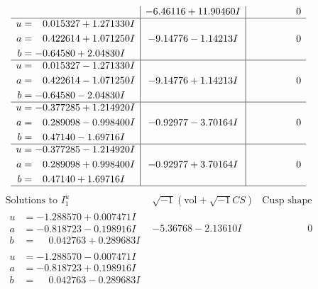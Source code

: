 \documentclass[1p]{elsarticle_modified}
\theoremstyle{definition}
\newcommand{\I}{\sqrt{-1}}
\begin{document}
$$\begin{array}{c|c|c}
 & -6.46116 + 11.90460 I & \phantom{-0.000000 } 0 \\ \hline\begin{aligned}
u &= \phantom{-}0.015327 + 1.271330 I \\
a &= \phantom{-}0.422614 + 1.071250 I \\
b &= -0.64580 + 2.04830 I\end{aligned}
 & -9.14776 - 1.14213 I & \phantom{-0.000000 } 0 \\ \hline\begin{aligned}
u &= \phantom{-}0.015327 - 1.271330 I \\
a &= \phantom{-}0.422614 - 1.071250 I \\
b &= -0.64580 - 2.04830 I\end{aligned}
 & -9.14776 + 1.14213 I & \phantom{-0.000000 } 0 \\ \hline\begin{aligned}
u &= -0.377285 + 1.214920 I \\
a &= \phantom{-}0.289098 - 0.998400 I \\
b &= \phantom{-}0.47140 - 1.69716 I\end{aligned}
 & -0.92977 - 3.70164 I & \phantom{-0.000000 } 0 \\ \hline\begin{aligned}
u &= -0.377285 - 1.214920 I \\
a &= \phantom{-}0.289098 + 0.998400 I \\
b &= \phantom{-}0.47140 + 1.69716 I\end{aligned}
 & -0.92977 + 3.70164 I & \phantom{-0.000000 } 0\\
 \hline 
 \end{array}$$\newpage$$\begin{array}{c|c|c}  
\text{Solutions to }I^u_{1}& \I (\text{vol} + \sqrt{-1}CS) & \text{Cusp shape}\\
 \hline 
\begin{aligned}
u &= -1.288570 + 0.007471 I \\
a &= -0.818723 - 0.198916 I \\
b &= \phantom{-}0.042763 + 0.289683 I\end{aligned}
 & -5.36768 - 2.13610 I & \phantom{-0.000000 } 0 \\ \hline\begin{aligned}
u &= -1.288570 - 0.007471 I \\
a &= -0.818723 + 0.198916 I \\
b &= \phantom{-}0.042763 - 0.289683 I\end{aligned}

\end{array}$$
\end{document}
